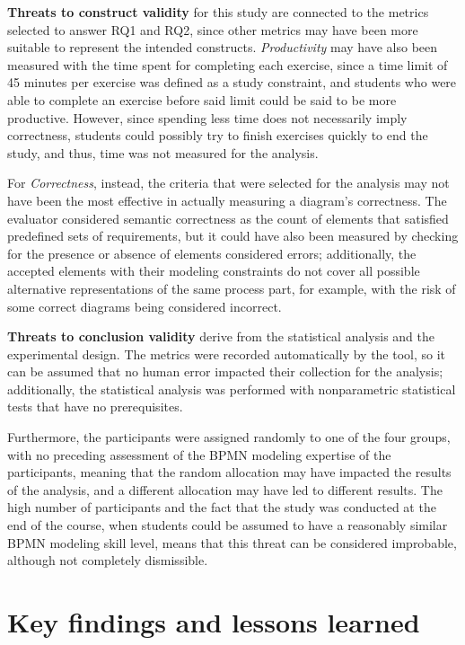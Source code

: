 \textbf{Threats to construct validity} for this study are connected to the metrics selected to answer RQ1 and RQ2, since other metrics may have been more suitable to represent the intended constructs.
\textit{Productivity} may have also been measured with the time spent for completing each exercise, since a time limit of 45 minutes per exercise was defined as a study constraint, and students who were able to complete an exercise before said limit could be said to be more productive. However, since spending less time does not necessarily imply correctness, students could possibly try to finish exercises quickly to end the study, and thus, time was not measured for the analysis. 

For \textit{Correctness}, instead, the criteria that were selected for the analysis may not have been the most effective in actually measuring a diagram's correctness. The evaluator considered semantic correctness as the count of elements that satisfied predefined sets of requirements, but it could have also been measured by checking for the presence or absence of elements considered errors; additionally, the accepted elements with their modeling constraints do not cover all possible alternative representations of the same process part, for example, with the risk of some correct diagrams being considered incorrect.

\textbf{Threats to conclusion validity} derive from the statistical analysis and the experimental design. The metrics were recorded automatically by the tool, so it can be assumed that no human error impacted their collection for the analysis; additionally, the statistical analysis was performed with nonparametric statistical tests that have no prerequisites.

Furthermore, the participants were assigned randomly to one of the four groups, with no preceding assessment of the BPMN modeling expertise of the participants, meaning that the random allocation may have impacted the results of the analysis, and a different allocation may have led to different results. The high number of participants and the fact that the study was conducted at the end of the course, when students could be assumed to have a reasonably similar BPMN modeling skill level, means that this threat can be considered improbable, although not completely dismissible.

\section{Key findings and lessons learned}

